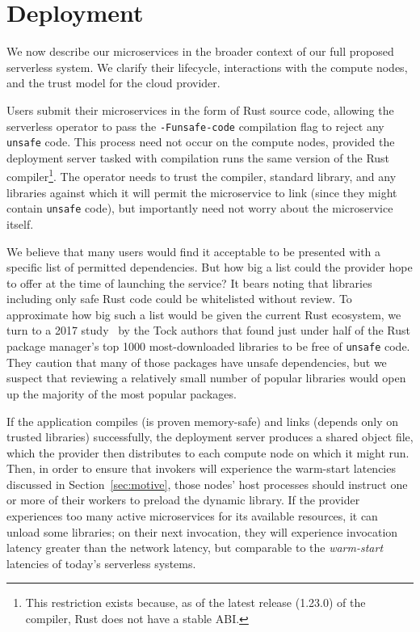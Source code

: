 \section{Deployment}
\label{sec:deploy}

We now describe our microservices in the broader context of our full proposed
serverless system.  We clarify their lifecycle, interactions with the compute nodes,
and the trust model for the cloud provider.

Users submit their microservices in the form of Rust source code, allowing the
serverless operator to pass the \texttt{-Funsafe-code} compilation flag to reject
any \texttt{unsafe} code.  This process need not occur on the compute
nodes, provided the deployment server tasked with compilation runs the same version
of the Rust compiler\footnote{This restriction exists because, as of the latest
release (1.23.0) of the compiler, Rust does not have a stable ABI.}.  The operator
needs to trust the compiler, standard library, and any libraries against which it
will permit the microservice to link (since they might contain \texttt{unsafe} code),
but importantly need not worry about the microservice itself.

We believe that many users would find it acceptable to be presented with a specific
list of permitted dependencies.  But how big a list could the provider hope to offer
at the time of launching the service?  It bears noting that libraries including only
safe Rust code could be whitelisted without review.  To approximate how big such a
list would be given the current Rust ecosystem, we turn to a 2017
study~\cite{www-cratesio-unsafe} by the Tock authors that found just under half of
the Rust package manager's top 1000 most-downloaded libraries to be free of
\texttt{unsafe} code.  They caution that many of those packages have unsafe
dependencies, but we suspect that reviewing a relatively small number of popular
libraries would open up the majority of the most popular packages.

If the application compiles (is proven memory-safe) and links (depends only on
trusted libraries) successfully, the deployment server produces a shared object file,
which the provider then distributes to each compute node on which it might run.
Then, in order to ensure that invokers will experience the warm-start latencies
discussed in Section~\ref{sec:motive}, those nodes' host processes should instruct
one or more of their workers to preload the dynamic library.  If the provider
experiences too many active microservices for its available resources, it can
unload some libraries; on their next invocation, they will experience invocation
latency greater than the network latency, but comparable to the \textit{warm-start}
latencies of today's serverless systems.

